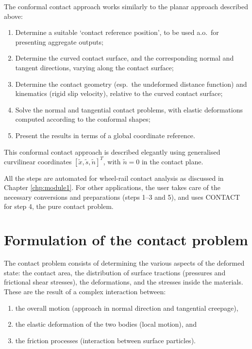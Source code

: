 \documentclass[12pt]{report}
\begin{document}
The conformal contact approach works similarly to the planar approach
described above:
\begin{enumerate}
\item Determine a suitable `contact reference position', to be used a.o.\
        for presenting aggregate outputs;
\item Determine the curved contact surface, and the corresponding normal
        and tangent directions, varying along the contact surface;
\item Determine the contact geometry (esp.\ the undeformed distance
        function) and kinematics (rigid slip velocity), relative to the
        curved contact surface;
\item Solve the normal and tangential contact problems, with elastic
        deformations computed according to the conformal shapes;
\item Present the results in terms of a global coordinate reference.
\end{enumerate}
This conformal contact approach is described elegantly using generalised
curvilinear coordinates $[\tilde{x},\tilde{s},\tilde{n}]^T$, with
$\tilde{n}=0$ in the contact plane.

All the steps are automated for wheel-rail contact analysis as discussed in
Chapter \ref{chp:module1}. For other applications, the user takes care of
the necessary conversions and preparations (steps 1--3 and 5), and uses
CONTACT for step 4, the pure contact problem.

\section{Formulation of the contact problem}
\label{sec:contin_form}

The contact problem consists of determining the various aspects of the
deformed state: the contact area, the distribution of surface tractions
(pressures and frictional shear stresses), the deformations, and the
stresses inside the materials. These are the result of a complex interaction
between:
\begin{enumerate}
\item the overall motion (approach in normal direction and tangential
        creepage),
\item the elastic deformation of the two bodies (local motion), and
\item the friction processes (interaction between surface particles).
\end{enumerate}
\end{document}
